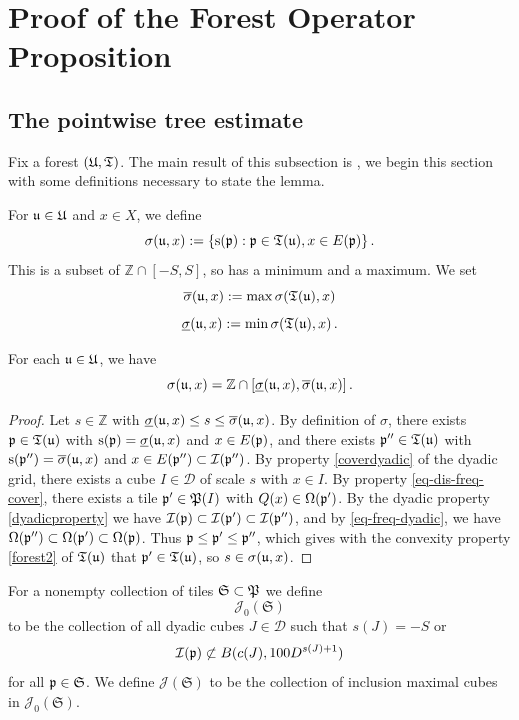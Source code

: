 \section{Proof of the Forest Operator Proposition}

\label{treesection}

\subsection{The pointwise tree estimate}
Fix a forest $({\mathfrak U}, {\mathfrak T})$. The main result of this subsection is , we begin this section with some definitions necessary to state the lemma.

For ${\mathfrak u} \in {\mathfrak U}$ and $x\in X$, we define
$$
    \sigma ({\mathfrak u}, x):=\{{\mathrm{s}}({\mathfrak p}):{\mathfrak p}\in {\mathfrak T}({\mathfrak u}), x\in E({\mathfrak p})\}\,.
$$
This is a subset of $\mathbb{Z} \cap [-S, S]$, so has a minimum and a maximum. We set
$$
    \overline{\sigma} ({\mathfrak u}, x) := \max \sigma({\mathfrak T}({\mathfrak u}), x)
$$
$$
    \underline{\sigma} ({\mathfrak u}, x) := \min\sigma({\mathfrak T}({\mathfrak u}), x)\,.
$$
\begin{lemma}
\label{convex-scales}
\leanok
{}
    For each ${\mathfrak u} \in {\mathfrak U}$, we have
    $$
        \sigma({\mathfrak u}, x) = \mathbb{Z} \cap [\underline{\sigma} ({\mathfrak u}, x), \overline{\sigma} ({\mathfrak u}, x)]\,.
    $$
\end{lemma}

\begin{proof}
    \leanok
    Let $s \in \mathbb{Z}$ with $\underline{\sigma} ({\mathfrak u}, x) \le s \le \overline{\sigma} ({\mathfrak u}, x)$. By definition of $\sigma$, there exists ${\mathfrak p} \in {\mathfrak T}({\mathfrak u})$ with ${\mathrm{s}}({\mathfrak p}) = \underline{\sigma} ({\mathfrak u}, x)$ and $x \in E({\mathfrak p})$, and there exists ${\mathfrak p}'' \in {\mathfrak T}({\mathfrak u})$ with ${\mathrm{s}}({\mathfrak p}'') = \overline{\sigma} ({\mathfrak u}, x)$ and $x \in E({\mathfrak p}'') \subset {\mathcal{I}}({\mathfrak p}'')$. By property \eqref{coverdyadic} of the dyadic grid, there exists a cube $I \in \mathcal{D}$ of scale $s$ with $x \in I$. By property \eqref{eq-dis-freq-cover}, there exists a tile ${\mathfrak p}' \in {\mathfrak P}(I)$ with ${Q}(x) \in {\Omega}({\mathfrak p}')$. By the dyadic property \eqref{dyadicproperty} we have ${\mathcal{I}}({\mathfrak p}) \subset {\mathcal{I}}({\mathfrak p}') \subset {\mathcal{I}}({\mathfrak p}'')$, and by \eqref{eq-freq-dyadic}, we have ${\Omega}({\mathfrak p}'') \subset {\Omega}({\mathfrak p}') \subset {\Omega}({\mathfrak p})$. Thus ${\mathfrak p} \le {\mathfrak p}' \le{\mathfrak p}''$, which gives with the convexity property \eqref{forest2} of ${\mathfrak T}({\mathfrak u})$ that ${\mathfrak p}' \in {\mathfrak T}({\mathfrak u})$, so $s \in \sigma({\mathfrak u}, x)$.
\end{proof}

For a nonempty collection of tiles $\mathfrak{S} \subset {\mathfrak P}$ we define
$$
    \mathcal{J}_0(\mathfrak{S})
$$
to be the collection of all dyadic cubes $J \in \mathcal{D}$ such that $s(J) = -S$ or
$$
    {\mathcal{I}}({\mathfrak p}) \not\subset B(c(J), 100D^{s(J) + 1})
$$
for all ${\mathfrak p} \in \mathfrak{S}$. We define $\mathcal{J}(\mathfrak{S})$ to be the collection of inclusion maximal cubes in $\mathcal{J}_0(\mathfrak{S})$.

